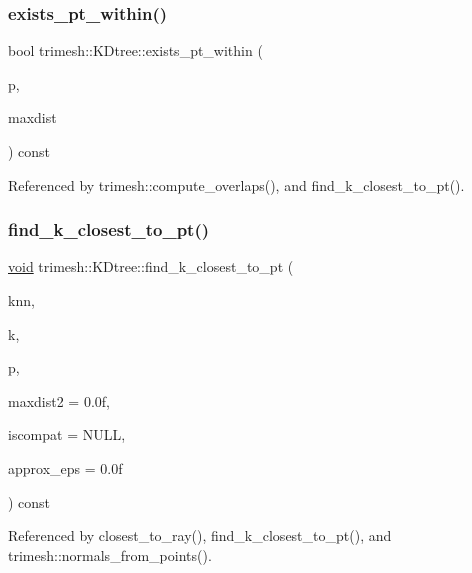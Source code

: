 \subsubsection{\texorpdfstring{exists\+\_\+pt\+\_\+within()}{exists\_pt\_within()}}
{\footnotesize\ttfamily bool trimesh\+::\+K\+Dtree\+::exists\+\_\+pt\+\_\+within (\begin{DoxyParamCaption}\item[{const float $\ast$}]{p,  }\item[{float}]{maxdist }\end{DoxyParamCaption}) const}



Referenced by trimesh\+::compute\+\_\+overlaps(), and find\+\_\+k\+\_\+closest\+\_\+to\+\_\+pt().

\mbox{\label{classtrimesh_1_1KDtree_a2b509a64df2781b18abac13a8683241d}} 
\subsubsection{\texorpdfstring{find\+\_\+k\+\_\+closest\+\_\+to\+\_\+pt()}{find\_k\_closest\_to\_pt()}\hspace{0.1cm}{\footnotesize\ttfamily [1/2]}}
{\footnotesize\ttfamily \hyperlink{namespacetrimesh_a784ddfd979e1c579bda795a8edfc3f43}{void} trimesh\+::\+K\+Dtree\+::find\+\_\+k\+\_\+closest\+\_\+to\+\_\+pt (\begin{DoxyParamCaption}\item[{\+::std\+::vector$<$ const float $\ast$$>$ \&}]{knn,  }\item[{int}]{k,  }\item[{const float $\ast$}]{p,  }\item[{float}]{maxdist2 = {\ttfamily 0.0f},  }\item[{const \hyperlink{structtrimesh_1_1KDtree_1_1CompatFunc}{Compat\+Func} $\ast$}]{iscompat = {\ttfamily NULL},  }\item[{float}]{approx\+\_\+eps = {\ttfamily 0.0f} }\end{DoxyParamCaption}) const}



Referenced by closest\+\_\+to\+\_\+ray(), find\+\_\+k\+\_\+closest\+\_\+to\+\_\+pt(), and trimesh\+::normals\+\_\+from\+\_\+points().

